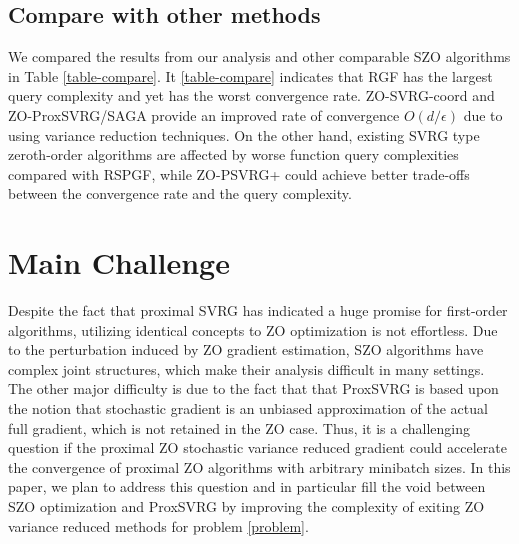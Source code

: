 \documentclass{article}
\theoremstyle{definition}
\theoremstyle{remark}
\begin{document}
\subsection{Compare with other methods}
We compared the results from our analysis and other comparable SZO algorithms in Table \ref{table-compare}. It \ref{table-compare} indicates
that RGF has the largest query complexity and yet has the worst convergence rate. ZO-SVRG-coord
and ZO-ProxSVRG/SAGA provide an improved rate of convergence $O(d/\epsilon )$ due to using variance reduction techniques. On the other hand, existing SVRG type zeroth-order algorithms are affected by worse function query complexities compared with RSPGF, while ZO-PSVRG+ could achieve better trade-offs between the convergence rate and the query complexity.


\section{Main Challenge}
Despite the fact that proximal SVRG has indicated a huge promise for first-order algorithms, utilizing identical concepts to ZO optimization is not effortless. 
Due to the perturbation induced by ZO gradient estimation, SZO algorithms have complex joint structures, which make their analysis difficult in many settings. The other major difficulty is due to the fact that that ProxSVRG is based upon the notion that stochastic gradient is an unbiased approximation of the actual full gradient, which is not retained in the ZO case. Thus, it is a challenging question if the proximal ZO stochastic variance reduced gradient could accelerate the convergence of proximal ZO algorithms with arbitrary minibatch sizes. In this paper, we plan to address this question and in particular fill the void between
SZO optimization and ProxSVRG by improving the complexity of exiting ZO variance reduced methods for problem \eqref{problem}.
\end{document}
